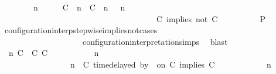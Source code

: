 \begin{isabellebody}
\ \ \ \ \ \ \ {\isacartoucheopen}{\isacharparenleft}{\isasymGamma}\ n\ {\isasymturnstile}\ {\isasymPsi}\ {\isasymtriangleright}\ {\isasymPhi}\ {\isacharequal}\ {\isacharparenleft}{\isacharparenleft}{\isacharparenleft}C\ {\isasymUp}\ n{\isacharparenright}\ {\isacharhash}\ {\isacharparenleft}C\ {\isasymnot}{\isasymUp}\ n{\isacharparenright}\ {\isacharhash}\ {\isasymGamma}{\isacharparenright}{\isacharcomma}\ n\isanewline
\ \ \ \ \ \ \ \ \ \ \ \ \ \ \ \ \ \ \ \ \ \ \ \ \ \ \ \ \ \ \ \ \ \ \ {\isasymturnstile}\ {\isasymPsi}\ {\isasymtriangleright}\ {\isacharparenleft}{\isacharparenleft}C\ implies\ not\ C\ {\isacharhash}\ {\isasymPhi}{\isacharparenright}{\isacharparenright}{\isacartoucheclose}\isanewline
\ \ \ \ \ \ \isamarkupfalse%
\ {\isacharquery}P\ \isamarkupfalse%
\ configuration{\isacharunderscore}interp{\isacharunderscore}stepwise{\isacharunderscore}implies{\isacharunderscore}not{\isacharunderscore}cases\isanewline
\ \ \ \ \ \ \ \ \ \ \ \ \ \ \ \ \ \ \ \ configuration{\isacharunderscore}interpretation{\isachardot}simps\ \isamarkupfalse%
\ blast\isanewline
\ \ \ \ \isamarkupfalse%
\isanewline
\ \ \ \ \ \ \isamarkupfalse%
\ {\isasymGamma}\ n\ C\ {\isasymdelta}{\isasymtau}\ C\ C\ {\isasymPsi}\ {\isasymPhi}\isanewline
\ \ \ \ \ \ \isamarkupfalse%
\ {\isacartoucheopen}{\isacharparenleft}{\isasymGamma}\ n\ {\isasymturnstile}\ {\isasymPsi}\ {\isasymtriangleright}\ {\isasymPhi}\ {\isacharequal}\isanewline
\ \ \ \ \ \ \ \ \ \ \ \ \ \ \ \ {\isacharparenleft}{\isasymGamma}{\isacharcomma}\ n\ {\isasymturnstile}\ {\isacharparenleft}{\isacharparenleft}C\ time{\isacharminus}delayed\ by\ {\isasymdelta}{\isasymtau}\ on\ C\ implies\ C\ {\isacharhash}\ {\isasymPsi}{\isacharparenright}\ {\isasymtriangleright}\ {\isasymPhi}{\isacharparenright}{\isacartoucheclose}\isanewline
\ \ \ \ \ \ \ {\isacartoucheopen}{\isacharparenleft}{\isasymGamma}\ n\ {\isasymturnstile}\ {\isasymPsi}\ {\isasymtriangleright}\ {\isasymPhi}\ {\isacharequal}\isanewline

\end{isabellebody}
